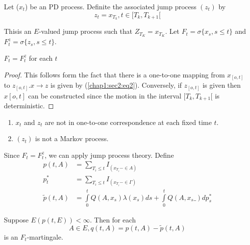 \smallskip
{}		

Let ($x_t$) be an PD process. Definite the associated jump process
$(z_t)$ by  
\begin{equation*}
  z_t = x_{T_k}, t \in [T_k, T_{k+1}[\tag{2}\label{chap1:sec2:eq2}
\end{equation*}		

This\pageoriginale is an $E$-valued jump process such that $Z_{T_K} =
x_{T_K}$. Let $F_t = \sigma \{ x_s, s \leq t \}$  and $F^z_t = \sigma
\{z_s, s \leq t\}$.  

\begin{prop}%
  $F_t = F^z_t$ for each $t$
\end{prop}

\begin{proof}
  This follows form the fact that there is a one-to-one mapping from
  $x_{[o,t]}$ to $z_{[o,t]}. x \to z $ is given by
  (\ref{chap1:sec2:eq2}). Conversely, 
  if $z_{[o,t]}$ is given then $x{[o,t]}$ can be constructed since the
  motion in the interval $[T_k, T_{k+1}[$ is deterministic. 
\end{proof}


\medskip
{}
\begin{enumerate}[(1)]
\item $x_t $ and $z_t$ are not in one-to-one correspondence at each
  fixed time $t$.  

\item $(z_t)$ is not a Markov process. 
\end{enumerate}
Since $F_t = F^z_t$, we can apply jump process theory. Define 
\begin{align*}
  p(t,A) &=  \sum\limits_{T_i \leq t}  I_{(x_{T_i}- \in  A)}\\
  p^*_t &= \sum\limits_{T_i \leq t}  I_{(x_{T_i}- \in  \Gamma)}\\
  \tilde{p}(t, A) &= \int\limits_0^t Q(A, x_s ) \lambda (x_s) ds +
  \int\limits_0^t Q(A, x_s\_)dp^*_s \tag{3}\label{chap1:sec2:eq3} 
\end{align*}

\begin{prop}\label{chap1:prop2.4}%
  Suppose  $E(p (t, E))< \infty $. Then for each
  \begin{equation}
    A \in  E, q (t, A) = p (t,A) - \tilde{p}(t,A) \tag{4}\label{chap1:sec2:eq4}
  \end{equation}
    is an  $F_t$-martingale.
\end{prop}

